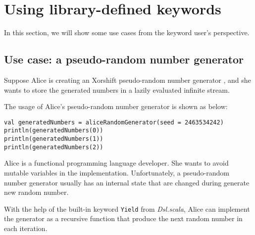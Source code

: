  


\section{Using library-defined keywords}

In this section, we will show some use cases from the keyword user's perspective.

\subsection{Use case: a pseudo-random number generator}

Suppose Alice is creating an Xorshift pseudo-random number generator \cite{marsaglia2003xorshift}, and she wants to store the generated numbers in a lazily evaluated infinite stream. 

The usage of Alice's pseudo-random number generator is shown as below:

\begin{lstlisting}[float={h t b p},caption={Using Alice's pseudo-random number generator},label={generatedNumbers}]
val generatedNumbers = aliceRandomGenerator(seed = 2463534242)
println(generatedNumbers(0))
println(generatedNumbers(1))
println(generatedNumbers(2))
\end{lstlisting}

Alice is a functional programming language developer. She wants to avoid mutable variables in the implementation. Unfortunately, a pseudo-random number generator usually has an internal state that are changed during generate new random number.

With the help of the built-in keyword \lstinline{Yield} from \textit{Dsl.scala}, Alice can implement the generator as a recursive function that produce the next random number in each iteration.

